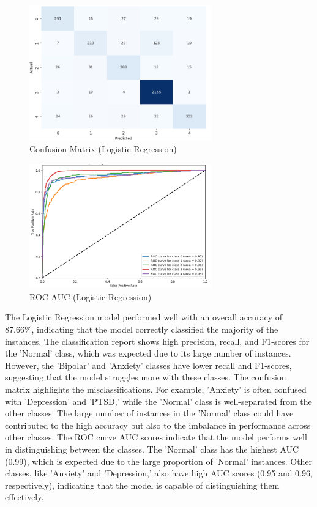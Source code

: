 \vspace{0.25em}

\begin{figure}[h!]  
    \centering
    \includegraphics[width=0.7\textwidth]{Images/LR Confusion Matrix.png}  
    \caption{Confusion Matrix (Logistic Regression)}
    \label{LRCM}  %
\end{figure}

\begin{figure}[h!]  
    \centering
    \includegraphics[width=0.7\textwidth]{Images/LR ROC.png}  
    \caption{ROC AUC (Logistic Regression)}
    \label{LRROC}  %
\end{figure}

\noindent
The Logistic Regression model performed well with an overall accuracy of 87.66\%, indicating that the model correctly classified the majority of the instances. The classification report shows high precision, recall, and F1-scores for the 'Normal' class, which was expected due to its large number of instances. However, the 'Bipolar' and 'Anxiety' classes have lower recall and F1-scores, suggesting that the model struggles more with these classes. The confusion matrix highlights the misclassifications. For example, 'Anxiety' is often confused with 'Depression' and 'PTSD,' while the 'Normal' class is well-separated from the other classes. The large number of instances in the 'Normal' class could have contributed to the high accuracy but also to the imbalance in performance across other classes. The ROC curve AUC scores indicate that the model performs well in distinguishing between the classes. The 'Normal' class has the highest AUC (0.99), which is expected due to the large proportion of 'Normal' instances. Other classes, like 'Anxiety' and 'Depression,' also have high AUC scores (0.95 and 0.96, respectively), indicating that the model is capable of distinguishing them effectively.


